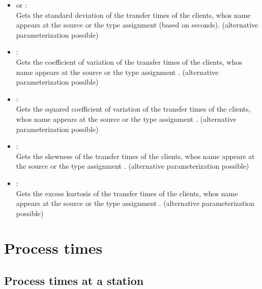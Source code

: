 \begin{itemize}
\item
{} or :\\
Gets the standard deviation of the transfer times of the clients, whos name appears at the source or the type assignment  (based on seconds).
(alternative parameterization possible)

\item
{}:\\
Gets the coefficient of variation of the transfer times of the clients, whos name appears at the source or the type assignment .
(alternative parameterization possible)

\item
{}:\\
Gets the squared coefficient of variation of the transfer times of the clients, whos name appears at the source or the type assignment .
(alternative parameterization possible)

\item
{}:\\
Gets the skewness of the transfer times of the clients, whos name appears at the source or the type assignment .
(alternative parameterization possible)

\item
{}:\\
Gets the excess kurtosis of the transfer times of the clients, whos name appears at the source or the type assignment .
(alternative parameterization possible)

\end{itemize}



\section{Process times}



\subsection{Process times at a station}

